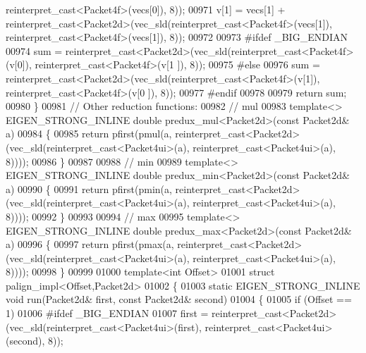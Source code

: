 \begin{DoxyCode}
{      reinterpret\_cast<Packet4f>(vecs[0]), 8));
00971   v[1] = vecs[1] + \textcolor{keyword}{reinterpret\_cast<}Packet2d\textcolor{keyword}{>}(vec\_sld(reinterpret\_cast<Packet4f>(vecs[1]), 
      reinterpret\_cast<Packet4f>(vecs[1]), 8));
00972  
00973 \textcolor{preprocessor}{#ifdef \_BIG\_ENDIAN}
00974   sum = \textcolor{keyword}{reinterpret\_cast<}Packet2d\textcolor{keyword}{>}(vec\_sld(reinterpret\_cast<Packet4f>(v[0]), reinterpret\_cast<Packet4f>(v[1
      ]), 8));
00975 \textcolor{preprocessor}{#else}
00976   sum = \textcolor{keyword}{reinterpret\_cast<}Packet2d\textcolor{keyword}{>}(vec\_sld(reinterpret\_cast<Packet4f>(v[1]), reinterpret\_cast<Packet4f>(v[0
      ]), 8));
00977 \textcolor{preprocessor}{#endif}
00978 
00979   \textcolor{keywordflow}{return} sum;
00980 \}
00981 \textcolor{comment}{// Other reduction functions:}
00982 \textcolor{comment}{// mul}
00983 \textcolor{keyword}{template}<> EIGEN\_STRONG\_INLINE \textcolor{keywordtype}{double} predux\_mul<Packet2d>(\textcolor{keyword}{const} Packet2d& a)
00984 \{
00985   \textcolor{keywordflow}{return} pfirst(pmul(a, reinterpret\_cast<Packet2d>(vec\_sld(reinterpret\_cast<Packet4ui>(a), 
      reinterpret\_cast<Packet4ui>(a), 8))));
00986 \}
00987 
00988 \textcolor{comment}{// min}
00989 \textcolor{keyword}{template}<> EIGEN\_STRONG\_INLINE \textcolor{keywordtype}{double} predux\_min<Packet2d>(\textcolor{keyword}{const} Packet2d& a)
00990 \{
00991   \textcolor{keywordflow}{return} pfirst(pmin(a, reinterpret\_cast<Packet2d>(vec\_sld(reinterpret\_cast<Packet4ui>(a), 
      reinterpret\_cast<Packet4ui>(a), 8))));
00992 \}
00993 
00994 \textcolor{comment}{// max}
00995 \textcolor{keyword}{template}<> EIGEN\_STRONG\_INLINE \textcolor{keywordtype}{double} predux\_max<Packet2d>(\textcolor{keyword}{const} Packet2d& a)
00996 \{
00997   \textcolor{keywordflow}{return} pfirst(pmax(a, reinterpret\_cast<Packet2d>(vec\_sld(reinterpret\_cast<Packet4ui>(a), 
      reinterpret\_cast<Packet4ui>(a), 8))));
00998 \}
00999 
01000 \textcolor{keyword}{template}<\textcolor{keywordtype}{int} Offset>
01001 \textcolor{keyword}{struct }palign\_impl<Offset,Packet2d>
01002 \{
01003   \textcolor{keyword}{static} EIGEN\_STRONG\_INLINE \textcolor{keywordtype}{void} run(Packet2d& first, \textcolor{keyword}{const} Packet2d& second)
01004   \{
01005     \textcolor{keywordflow}{if} (Offset == 1)
01006 \textcolor{preprocessor}{#ifdef \_BIG\_ENDIAN}
01007       first = \textcolor{keyword}{reinterpret\_cast<}Packet2d\textcolor{keyword}{>}(vec\_sld(reinterpret\_cast<Packet4ui>(first), 
      reinterpret\_cast<Packet4ui>(second), 8));
}
\end{DoxyCode}
